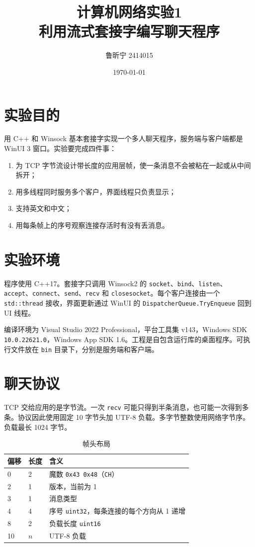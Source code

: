 \documentclass[10.5pt,a4paper,UTF8]{article}
\title{计算机网络实验1\\利用流式套接字编写聊天程序}
\author{鲁昕宁 2414015}
\date{\today}
\begin{document}
\begin{titlepage}
\maketitle
\end{titlepage}

\section{实验目的}
用 C++ 和 Winsock 基本套接字实现一个多人聊天程序，服务端与客户端都是 WinUI 3 窗口。实验要完成四件事：
\begin{enumerate}[leftmargin=2em]
    \item 为 TCP 字节流设计带长度的应用层帧，使一条消息不会被粘在一起或从中间拆开；
    \item 用多线程同时服务多个客户，界面线程只负责显示；
    \item 支持英文和中文；
    \item 用每条帧上的序号观察连接存活时有没有丢消息。
\end{enumerate}

\section{实验环境}
程序使用 C++17。套接字只调用 Winsock2 的 \texttt{socket}、\texttt{bind}、\texttt{listen}、\texttt{accept}、\texttt{connect}、\texttt{send}、\texttt{recv} 和 \texttt{closesocket}。每个客户连接由一个 \texttt{std::thread} 接收，界面更新通过 WinUI 的 \texttt{DispatcherQueue.TryEnqueue} 回到 UI 线程。

编译环境为 Visual Studio 2022 Professional，平台工具集 v143，Windows SDK \texttt{10.0.22621.0}，Windows App SDK 1.6。工程是自包含运行库的桌面程序。可执行文件放在 \texttt{bin} 目录下，分别是服务端和客户端。

\section{聊天协议}
TCP 交给应用的是字节流。一次 \texttt{recv} 可能只得到半条消息，也可能一次得到多条。协议因此使用固定 10 字节头加 UTF-8 负载。多字节整数使用网络字节序。负载最长 1024 字节。

\begin{table}[htbp]
\centering
\caption{帧头布局}
\label{tab:header}
\begin{tabular}{lll}
\toprule
偏移 & 长度 & 含义 \\
\midrule
0 & 2 & 魔数 \texttt{0x43 0x48}（\texttt{CH}） \\
2 & 1 & 版本，当前为 1 \\
3 & 1 & 消息类型 \\
4 & 4 & 序号 \texttt{uint32}，每条连接的每个方向从 1 递增 \\
8 & 2 & 负载长度 \texttt{uint16} \\
10 & $n$ & UTF-8 负载 \\
\bottomrule
\end{tabular}
\end{table}
\end{document}
